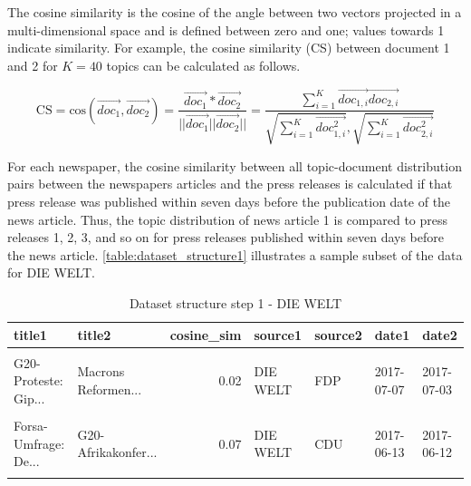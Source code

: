 \documentclass[
  12pt,
]{article}
\begin{document}
The cosine similarity is the cosine of the angle between two vectors
projected in a multi-dimensional space and is defined between zero and
one; values towards 1 indicate similarity. For example, the cosine
similarity (CS) between document 1 and 2 for \(K=40\) topics can be
calculated as follows.

\[
\text{CS} = \text{cos}(\vec{doc_1},\vec{doc_2})=\frac{\vec{doc_1}*\vec{doc_2}}{||\vec{doc_1}||\vec{doc_2}||}=\frac{\sum^K_{i=1} \vec{doc_{1,i}}\vec{doc_{2,i}}}{\sqrt{\sum^K_{i=1} \vec{doc^2_{1,i}}}, \sqrt{\sum^K_{i=1}\vec{doc^2_{2,i}}}}
\]

For each newspaper, the cosine similarity between all topic-document
distribution pairs between the newspapers articles and the press
releases is calculated if that press release was published within seven
days before the publication date of the news article. Thus, the topic
distribution of news article 1 is compared to press releases 1, 2, 3,
and so on for press releases published within seven days before the news
article. \autoref{table:dataset_structure1} illustrates a sample subset
of the data for DIE WELT.

\begin{table}[H]

\caption{\label{tab:Dataset structure 1}Dataset structure step 1 - DIE WELT \label{table:dataset_structure1}}
\centering
\fontsize{7}{9}\selectfont
\begin{tabular}[t]{llrllll}
\toprule
title1 & title2 & cosine\_sim & source1 & source2 & date1 & date2\\
\midrule
\cellcolor{gray!6}{Volker Kauder for...} & \cellcolor{gray!6}{Georg Pazderski: ...} & \cellcolor{gray!6}{0.17} & \cellcolor{gray!6}{DIE WELT} & \cellcolor{gray!6}{AfD} & \cellcolor{gray!6}{2017-08-05} & \cellcolor{gray!6}{2017-08-01}\\
G20-Proteste: Gip... & Macrons Reformen... & 0.02 & DIE WELT & FDP & 2017-07-07 & 2017-07-03\\
\cellcolor{gray!6}{Berliner Obdachlo...} & \cellcolor{gray!6}{Eumann: Brauchen ...} & \cellcolor{gray!6}{0.65} & \cellcolor{gray!6}{DIE WELT} & \cellcolor{gray!6}{SPD} & \cellcolor{gray!6}{2017-10-24} & \cellcolor{gray!6}{2017-10-18}\\
Forsa-Umfrage: De... & G20-Afrikakonfer... & 0.07 & DIE WELT & CDU & 2017-06-13 & 2017-06-12\\
\cellcolor{gray!6}{Ronja von Rönne: ...} & \cellcolor{gray!6}{Nitrat im Trinkwa...} & \cellcolor{gray!6}{0.21} & \cellcolor{gray!6}{DIE WELT} & \cellcolor{gray!6}{B90/GRÜNE} & \cellcolor{gray!6}{2017-06-13} & \cellcolor{gray!6}{2017-06-10}\\
\bottomrule
\end{tabular}
\end{table}
\end{document}
